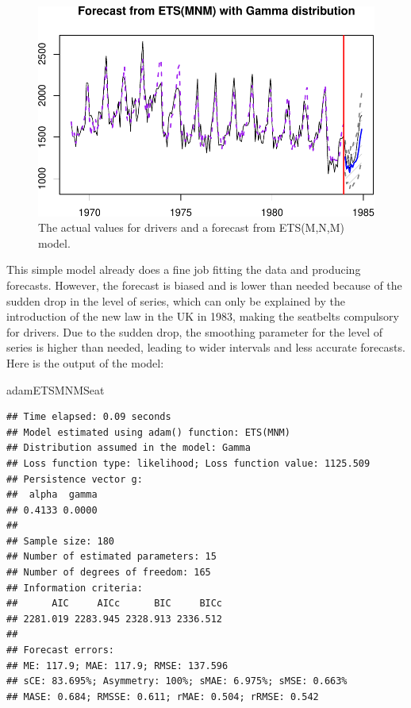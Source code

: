 \documentclass[
]{book}
\newenvironment{Shaded}{\begin{snugshade}}{\end{snugshade}}
\newcommand{\NormalTok}[1]{#1}
\theoremstyle{definition}
\theoremstyle{definition}
\theoremstyle{definition}
\theoremstyle{definition}
\theoremstyle{remark}
\begin{document}
\begin{figure}
\centering
\includegraphics{Svetunkov--2022----ADAM_files/figure-latex/SeatbeltsForecast-1.pdf}
\caption{\label{fig:SeatbeltsForecast}The actual values for drivers and a forecast from ETS(M,N,M) model.}
\end{figure}

This simple model already does a fine job fitting the data and producing forecasts. However, the forecast is biased and is lower than needed because of the sudden drop in the level of series, which can only be explained by the introduction of the new law in the UK in 1983, making the seatbelts compulsory for drivers. Due to the sudden drop, the smoothing parameter for the level of series is higher than needed, leading to wider intervals and less accurate forecasts. Here is the output of the model:

\begin{Shaded}
\begin{Highlighting}[]
\NormalTok{adamETSMNMSeat}
\end{Highlighting}
\end{Shaded}

\begin{verbatim}
## Time elapsed: 0.09 seconds
## Model estimated using adam() function: ETS(MNM)
## Distribution assumed in the model: Gamma
## Loss function type: likelihood; Loss function value: 1125.509
## Persistence vector g:
##  alpha  gamma 
## 0.4133 0.0000 
## 
## Sample size: 180
## Number of estimated parameters: 15
## Number of degrees of freedom: 165
## Information criteria:
##      AIC     AICc      BIC     BICc 
## 2281.019 2283.945 2328.913 2336.512 
## 
## Forecast errors:
## ME: 117.9; MAE: 117.9; RMSE: 137.596
## sCE: 83.695%; Asymmetry: 100%; sMAE: 6.975%; sMSE: 0.663%
## MASE: 0.684; RMSSE: 0.611; rMAE: 0.504; rRMSE: 0.542
\end{verbatim}
\end{document}
